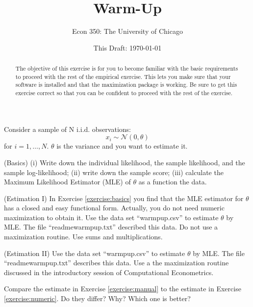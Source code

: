 



\title{Warm-Up}
\author{Econ 350: The University of Chicago}
\date{This Draft: \today}
\maketitle

\begin{abstract}
\noindent The objective of this exercise is for you to become familiar with the basic requirements to proceed with the rest of the empirical exercise. This lets you make sure that your software is installed and that the maximization package is working. Be sure to get this exercise correct so that you can be confident to proceed with the rest of the exercise. 
\end{abstract}

Consider a sample of N i.i.d. observations:
\begin{equation}
x_{i} \sim \mathcal{N}(0,\theta)
\end{equation}
\noindent for $i = 1, \ldots, N$. $\theta$ is the variance and you want to estimate it. 

\begin{exercise} (Basics) \label{exercise:basics}
(i) Write down the individual likelihood, the sample likelihood, and the sample log-likelihood; (ii) write down the sample score; (iii) calculate the Maximum Likelihood Estimator (MLE) of $\theta$ as a function the data.
\end{exercise}

\begin{exercise} (Estimation I) \label{exercise:manual}
In Exercise \ref{exercise:basics} you find that the MLE estimator for $\theta$ has a closed and easy functional form. Actually, you do not need numeric maximization to obtain it. Use the data set ``warmpup.csv'' to estimate $\theta$ by MLE. The file ``readmewarmpup.txt'' described this data. Do not use a maximization routine. Use sums and multiplications. 
\end{exercise}

\begin{exercise} (Estimation II) \label{exercise:numeric}
Use the data set ``warmpup.csv'' to estimate $\theta$ by MLE. The file ``readmewarmpup.txt'' describes this data. Use a the maximization routine discussed in the introductory session of Computational Econometrics.
\end{exercise}

\begin{exercise} 
Compare the estimate in Exercise \ref{exercise:manual} to the estimate in Exercise \ref{exercise:numeric}. Do they differ? Why? Which one is better?
\end{exercise}

